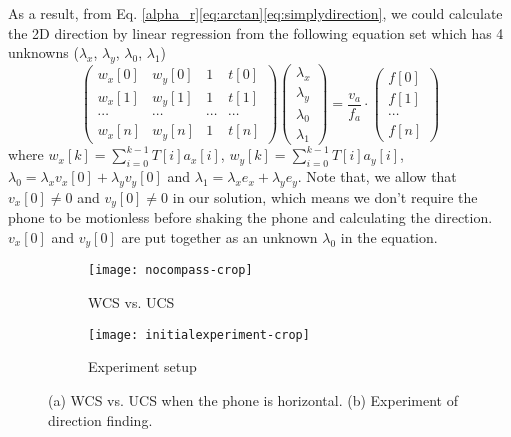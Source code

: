 \documentclass[]{sig-alternate-10pt}
\begin{document}
As a result, from
Eq. \eqref{alpha_r}\eqref{eq:arctan}\eqref{eq:simplydirection}, we
could calculate the 2D direction by linear regression from the following
equation set which has 4 unknowns ($\lambda_x$, $\lambda_y$,
$\lambda_0$, $\lambda_1$)
\begin{equation*}
\left(\begin{array}{cccc}
    w_{x}[0] & w_{y}[0] & 1 & t[0] \\
    w_{x}[1] & w_{y}[1] & 1 & t[1]\\
    \cdots & \cdots & \cdots & \cdots \\
    w_{x}[n] & w_{y}[n] & 1 & t[n]
\end{array}\right)\left(\begin{array}{c}
\lambda_{x}\\
\lambda_{y}\\
\lambda_{0}\\
\lambda_{1}
\end{array}\right)=\frac{v_{a}}{f_{a}}\cdot\left(\begin{array}{c}
f[0]\\
f[1]\\
\cdots\\
f[n]
\end{array}\right)
\end{equation*}
where $w_x[k]=\sum_{i=0}^{k-1}T[i]a_x[i]$,
$w_y[k]=\sum_{i=0}^{k-1}T[i]a_y[i]$,
$\lambda_0=\lambda_xv_x[0]+\lambda_yv_y[0]$ and
$\lambda_1=\lambda_xe_x+\lambda_ye_y$. Note that, we allow that
$v_x[0]\not=0$ and $v_y[0]\not=0$ in our solution, which means we
don't require the phone to be motionless before shaking the phone and
calculating the direction. $v_x[0]$ and $v_y[0]$ are put together as an unknown
$\lambda_0$ in the equation.


\begin{figure}[h]
\begin{center}
\begin{subfigure}[b]{0.18\textwidth}
\texttt{[image: nocompass-crop]}
        \caption{WCS vs. UCS}
\end{subfigure}
\begin{subfigure}[b]{0.23\textwidth}
\texttt{[image: initialexperiment-crop]}
        \caption{Experiment setup}
\end{subfigure}

    \caption{(a) WCS vs. UCS when the phone is horizontal. (b) Experiment of direction finding.}
    \label{fig:duallayout}
\end{center}
\end{figure}
\end{document}
